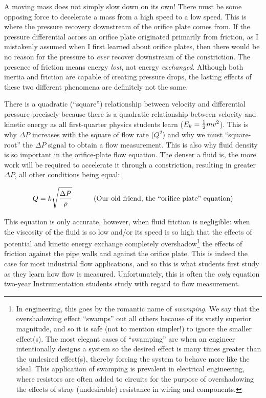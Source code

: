\label{Fluid acceleration in a venturi}

A moving mass does not simply slow down on its own!  There must be some opposing force to decelerate a mass from a high speed to a low speed.  This is where the pressure recovery downstream of the orifice plate comes from.  If the pressure differential across an orifice plate originated primarily from friction, as I mistakenly assumed when I first learned about orifice plates, then there would be no reason for the pressure to \textit{ever} recover downstream of the constriction.  The presence of friction means energy \textit{lost}, not energy \textit{exchanged}.  Although both inertia and friction are capable of creating pressure drops, the lasting effects of these two different phenomena are definitely not the same.

There is a quadratic (``square'') relationship between velocity and differential pressure precisely because there is a quadratic relationship between velocity and kinetic energy as all first-quarter physics students learn ($E_k = {1 \over 2} m v^2$).  This is why $\Delta P$ increases with the square of flow rate ($Q^2$) and why we must ``square-root'' the $\Delta P$ signal to obtain a flow measurement.  This is also why fluid density is so important in the orifice-plate flow equation.  The denser a fluid is, the more work will be required to accelerate it through a constriction, resulting in greater $\Delta P$, all other conditions being equal:

$$Q = k \sqrt{{\Delta P} \over \rho} \hbox{\hskip 30pt (Our old friend, the ``orifice plate'' equation)}$$

This equation is only accurate, however, when fluid friction is negligible: when the viscosity of the fluid is so low and/or its speed is so high that the effects of potential and kinetic energy exchange completely overshadow\footnote{In engineering, this goes by the romantic name of \textit{swamping}.  We say that the overshadowing effect ``swamps'' out all others because of its vastly superior magnitude, and so it is safe (not to mention simpler!) to ignore the smaller effect(s).  The most elegant cases of ``swamping'' are when an engineer intentionally designs a system so the desired effect is many times greater than the undesired effect(s), thereby forcing the system to behave more like the ideal.  This application of swamping is prevalent in electrical engineering, where resistors are often added to circuits for the purpose of overshadowing the effects of stray (undesirable) resistance in wiring and components.} the effects of friction against the pipe walls and against the orifice plate.  This is indeed the case for most industrial flow applications, and so this is what students first study as they learn how flow is measured.  Unfortunately, this is often the \textit{only} equation two-year Instrumentation students study with regard to flow measurement.  

